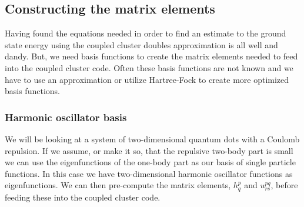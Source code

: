 \documentclass[
    a4paper, aps, twocolumn, floatfix, superscriptaddress,
    nofootinbib]{revtex4-1}
\newcommand{\1}{\mathds{1}}
\begin{document}
    \subsection{Constructing the matrix elements}
        Having found the equations needed in order to find an estimate to the
        ground state energy using the coupled cluster doubles approximation is
        all well and dandy. But, we need basis functions to create the matrix
        elements needed to feed into the coupled cluster code.  Often these
        basis functions are not known and we have to use an approximation or
        utilize Hartree-Fock to create more optimized basis functions.

        \subsubsection{Harmonic oscillator basis}
            We will be looking at a system of two-dimensional quantum dots with
            a Coulomb repulsion.  If we assume, or make it so, that the
            repulsive two-body part is small we can use the eigenfunctions of
            the one-body part as our basis of single particle functions. In this
            case we have two-dimensional harmonic oscillator functions as
            eigenfunctions. We can then pre-compute the matrix elements, $h_q^p$
            and $u_{rs}^{pq}$, before feeding these into the coupled cluster
            code.
\end{document}
